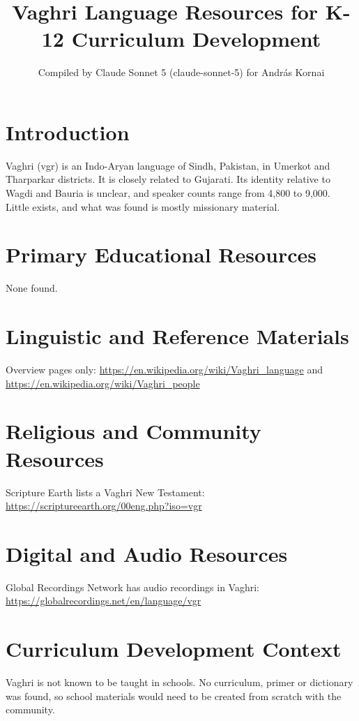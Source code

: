 \documentclass[12pt]{article}
\title{Vaghri Language Resources for K-12 Curriculum Development}
\author{Compiled by Claude Sonnet 5 (claude-sonnet-5) for Andr\'as Kornai}
\date{}
\begin{document}
\maketitle

\section{Introduction}
Vaghri (vgr) is an Indo-Aryan language of Sindh, Pakistan, in Umerkot and Tharparkar districts. It is closely related to Gujarati. Its identity relative to Wagdi and Bauria is unclear, and speaker counts range from 4,800 to 9,000. Little exists, and what was found is mostly missionary material.

\section{Primary Educational Resources}
None found.

\section{Linguistic and Reference Materials}
Overview pages only: \url{https://en.wikipedia.org/wiki/Vaghri_language} and \url{https://en.wikipedia.org/wiki/Vaghri_people}

\section{Religious and Community Resources}
Scripture Earth lists a Vaghri New Testament: \url{https://scriptureearth.org/00eng.php?iso=vgr}

\section{Digital and Audio Resources}
Global Recordings Network has audio recordings in Vaghri: \url{https://globalrecordings.net/en/language/vgr}

\section{Curriculum Development Context}
Vaghri is not known to be taught in schools. No curriculum, primer or dictionary was found, so school materials would need to be created from scratch with the community.
\end{document}
